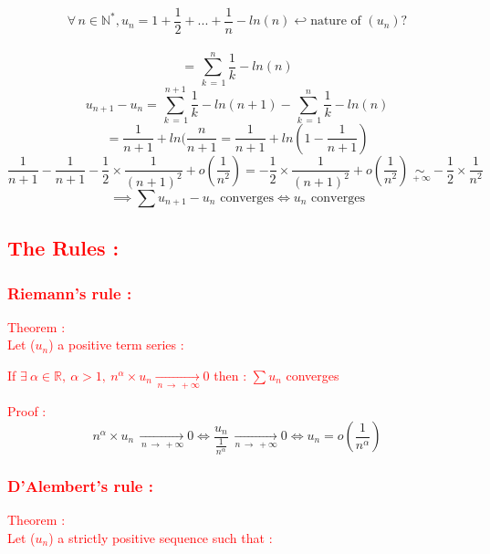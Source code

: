 \documentclass[a4paper,12pt]{article}
\begin{document}
\[
\forall \, n\in \mathbb{N}^*, u_n = 1+ \frac{1}{2} +...+ \frac{1}{n} - ln(n) \hookleftarrow \text{nature of } (u_n)?
\] \\
\[
= \sum_{\,k\,=\,1}^{n}{\frac{1}{k}} - ln(n)
\]
\bigskip
\[
u_{n+1} -u_n = \sum_{\,k\,=\,1}^{n+1}{\frac{1}{k}} - ln(n+1) -\sum_{\,k\,=\,1}^{n}{\frac{1}{k}} - ln(n)
\]
\bigskip
\[
= \frac{1}{n+1} +ln(\frac{n}{n+1} = \frac{1}{n+1} + ln(1 -\frac{1}{n+1})
\]
\bigskip
\[
\frac{1}{n+1} - \frac{1}{n+1} - \frac{1}{2} \times \frac{1}{(n+1)^2} + o(\frac{1}{n^2}) = -\frac{1}{2} \times \frac{1}{(n+1)^2} + o(\frac{1}{n^2}) \underset{\,+\infty}{\sim} -\frac{1}{2} \times \frac{1}{n^2}
\]
\bigskip
\[
\implies \sum{u_{n+1} - u_n} \text{ converges} \Leftrightarrow u_n \text{ converges}
\]

\textcolor{red}{\subsection*{The Rules :}}

\textcolor{red}{\subsubsection*{Riemann's rule :}}
\bigskip
\textcolor{red}{Theorem :}\\

\textcolor{red}{Let ($u_n$) a positive term series :}
\bigskip

\textcolor{red}{If $\exists \: \alpha\in\mathbb{R}, \: \alpha>1, \: n^\alpha \times u_n \underset{\,n\,\to\,+\infty}{\to} 0$
then : $\sum{u_n}$ converges} 
\bigskip


\textcolor{red}{Proof :}\\

\[ n^\alpha \times u_n \, \underset{\,n\,\to\,+\infty}{\to} 0 \Leftrightarrow \frac{u_n}{\frac{1}{n^\alpha}} \: \underset{n\,\to \,+\infty}{\to} 0 \Leftrightarrow u_n = o(\frac{1}{n^\alpha})
\]
\bigskip

\newpage
\textcolor{red}{\subsubsection*{D'Alembert's rule :}}
\bigskip

\textcolor{red}{Theorem :}\\

\textcolor{red}{Let ($u_n$) a strictly positive sequence such that : }\\
\end{document}
